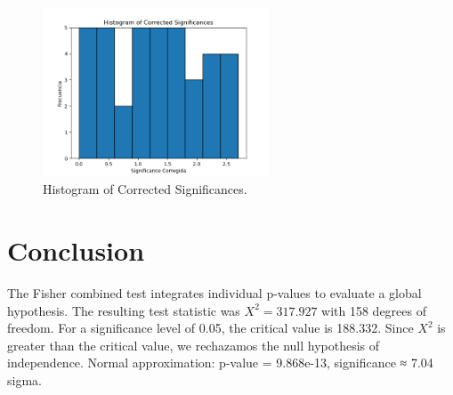 \documentclass[12pt]{article}
\begin{document}
\begin{figure}[h!]
\centering
\includegraphics[width=0.6\textwidth]{corrected_significance_hist.png}
\caption{Histogram of Corrected Significances.}
\end{figure}

\section*{Conclusion}
The Fisher combined test integrates individual p-values to evaluate a global hypothesis.
The resulting test statistic was $X^2 = 317.927$ with 158 degrees of freedom.
For a significance level of 0.05, the critical value is 188.332.
Since $X^2$ is greater than the critical value, we rechazamos the null hypothesis of independence.
Normal approximation: p-value = 9.868e-13, significance ≈ 7.04 sigma.
\end{document}
